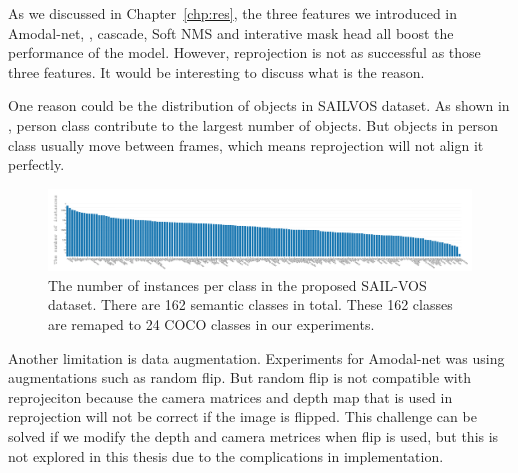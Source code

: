 As we discussed in Chapter~\ref{chp:res}, the three features we introduced in Amodal-net, \ie, cascade, Soft NMS and interative mask head all boost the performance of the model. However, reprojection is not as successful as those three features. It would be interesting to discuss what is the reason.

One reason could be the distribution of objects in SAILVOS dataset. As shown in , person class contribute to the largest number of objects. But objects in person class usually move between frames, which means reprojection will not align it perfectly.

\begin{figure}[t]
\centering
\includegraphics[scale=0.23]{fig/sailvos_cls_dist.png}

\caption{The number of instances per class in the proposed SAIL-VOS dataset. There are 162 semantic classes in total. These 162 classes are remaped to 24 COCO classes in our experiments. }
\label{fig:sailvos_cls}
\end{figure}

Another limitation is data augmentation. Experiments for Amodal-net was using augmentations such as random flip. But random flip is not compatible with reprojeciton because the camera matrices and depth map that is used in reprojection will not be correct if the image is flipped. This challenge can be solved if we modify the depth and camera metrices when flip is used, but this is not explored in this thesis due to the complications in implementation.